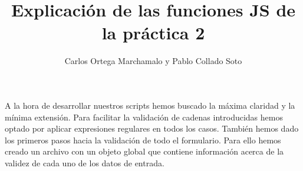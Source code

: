 \documentclass{article}[13pt]
\title{Explicación de las funciones JS de la práctica 2}
\author{Carlos Ortega Marchamalo y Pablo Collado Soto}
\date{}
\begin{document}
  \maketitle

  A la hora de desarrollar nuestros scripts hemos buscado la máxima claridad y la mínima extensión. Para facilitar la validación de cadenas introducidas hemos optado por aplicar expresiones regulares en todos los casos. También hemos dado los primeros pasos hacia la validación de todo el formulario. Para ello hemos creado un archivo con un objeto global que contiene información acerca de la validez de cada uno de los datos de entrada.
\end{document}
